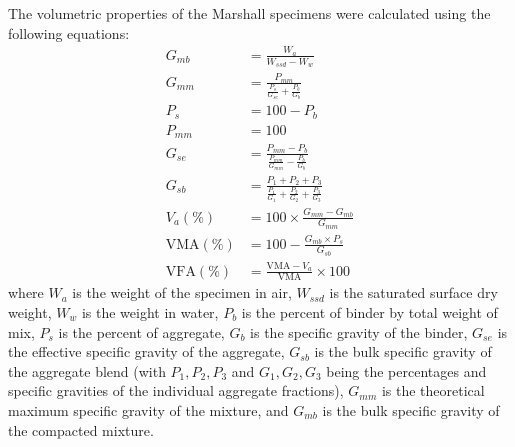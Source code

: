 \documentclass[12pt,a4paper]{article}
\begin{document}
The volumetric properties of the Marshall specimens were calculated using the following equations:
\begin{align}
    G_{mb} &= \frac{W_a}{W_{ssd} - W_w} \\
    G_{mm} &= \frac{P_{mm}}{\frac{P_s}{G_{se}} + \frac{P_b}{G_b}} \\
    P_s &= 100 - P_b \\
    P_{mm} &= 100 \\
    G_{se} &= \frac{P_{mm} - P_b}{\frac{P_{mm}}{G_{mm}} - \frac{P_b}{G_b}} \\
    G_{sb} &= \frac{P_1 + P_2 + P_3}{\frac{P_1}{G_1} + \frac{P_2}{G_2} + \frac{P_3}{G_3}} \\
    V_a (\%) &= 100 \times \frac{G_{mm} - G_{mb}}{G_{mm}} \\
    \text{VMA} (\%) &= 100 - \frac{G_{mb} \times P_s}{G_{sb}} \\
    \text{VFA} (\%) &= \frac{\text{VMA} - V_a}{\text{VMA}} \times 100
\end{align}
where $W_a$ is the weight of the specimen in air, $W_{ssd}$ is the saturated surface dry weight, $W_w$ is the weight in water, $P_b$ is the percent of binder by total weight of mix, $P_s$ is the percent of aggregate, $G_b$ is the specific gravity of the binder, $G_{se}$ is the effective specific gravity of the aggregate, $G_{sb}$ is the bulk specific gravity of the aggregate blend (with $P_1, P_2, P_3$ and $G_1, G_2, G_3$ being the percentages and specific gravities of the individual aggregate fractions), $G_{mm}$ is the theoretical maximum specific gravity of the mixture, and $G_{mb}$ is the bulk specific gravity of the compacted mixture.
\end{document}
